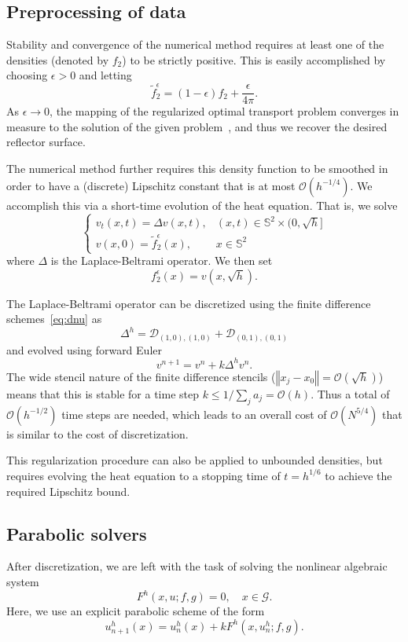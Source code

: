 \documentclass{amsart}
\newcommand{\bq}{\begin{equation}}
\newcommand{\eq}{\end{equation}}
\newcommand{\norm}[1]{\left\Vert#1\right\Vert}
\newcommand{\G}{\mathcal{G}}
\newcommand{\bO}{\mathcal{O}}
\newcommand{\Dt}{\mathcal{D}}
\newcommand{\Sf}{\mathbb{S}^{2}}
\newcommand*{\avint}{\mathop{\ooalign{$\int$\cr$-$}}}
\theoremstyle{lemma}
\theoremstyle{remark}
\begin{document}
\subsection{Preprocessing of data}\label{preprocessing}
Stability and convergence of the numerical method requires at least one of the densities (denoted by $f_2$) to be strictly positive.  This is easily accomplished by choosing $\epsilon>0$ and letting
\bq\label{eq:f2pos}
\tilde{f}_2^\epsilon = (1-\epsilon)f_2 + \frac{\epsilon}{4\pi}.
\eq
As $\epsilon\to0$, the mapping of the regularized optimal transport problem converges in measure to the solution of the given problem~\cite{Villani1}, and thus we recover the desired reflector surface.

The numerical method further requires this density function to be smoothed in order to have a (discrete) Lipschitz constant that is at most $\bO\left(h^{-1/4}\right)$.  We accomplish this via a short-time evolution of the heat equation.  That is, we solve
\bq\label{eq:heat}
\begin{cases}
v_t(x,t) = \Delta v(x,t), &(x,t)\in\Sf\times(0,\sqrt{h}]\\
v(x,0) = \tilde{f}_2^\epsilon(x), &x\in\Sf
\end{cases}
\eq
where $\Delta$ is the Laplace-Beltrami operator.  We then set
\bq\label{eq:f2reg}
f_2^\epsilon(x) = v(x,\sqrt{h}).
\eq

The Laplace-Beltrami operator can be discretized using the finite difference schemes~\eqref{eq:dnu} as
\bq\label{eq:Laplace}
\Delta^h = \Dt_{(1,0),(1,0)} + \Dt_{(0,1),(0,1)}
\eq
and evolved using forward Euler
\bq\label{eq:heatDisc}
v^{n+1} = v^n + k \Delta^hv^n.
\eq
The wide stencil nature of the finite difference stencils ($\norm{x_j-x_0} = \bO(\sqrt{h})$) means that this is stable for a time step $k \leq 1/\sum\limits_j a_j = \bO(h)$.  Thus a total of $\bO\left(h^{-1/2}\right)$ time steps are needed, which leads to an overall cost of $\bO\left(N^{5/4}\right)$ that is similar to the cost of discretization.

This regularization procedure can also be applied to unbounded densities, but requires evolving the heat equation to a stopping time of $t=h^{1/6}$ to achieve the required Lipschitz bound.

\subsection{Parabolic solvers}
After discretization, we are left with the task of solving the nonlinear algebraic system
\bq\label{eq:system}
F^h(x,u;f,g) = 0, \quad x \in \G.
\eq
Here, we use an explicit  parabolic scheme of the form
\bq\label{eq:parabolic}
u_{n+1}^h(x) = u_n^h(x) + k F^h(x,u^h_n;f,g).
\eq
\end{document}
